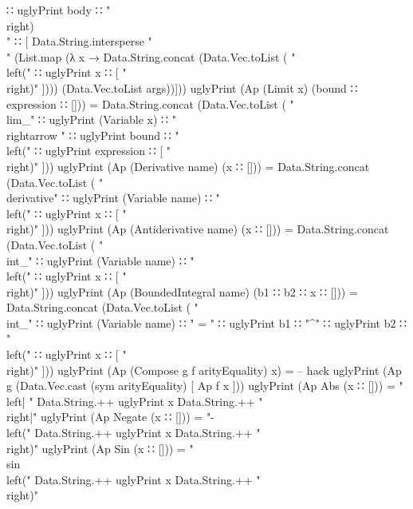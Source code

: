 \documentclass{report}
\begin{document}
\begin{code}
      ∷ uglyPrint body
      ∷ "\\right)\\ "
      ∷ [ Data.String.intersperse
            "\\ "
            (List.map
              (λ x → Data.String.concat (Data.Vec.toList
                       ( "\\left("
                       ∷ uglyPrint x
                       ∷ [ "\\right)" ])))
              (Data.Vec.toList args))]))
  uglyPrint (Ap (Limit x) (bound ∷ expression ∷ [])) =
    Data.String.concat (Data.Vec.toList
      ( "\\lim_{"
      ∷ uglyPrint (Variable x)
      ∷ " \\rightarrow "
      ∷ uglyPrint bound
      ∷ "} \\left("
      ∷ uglyPrint expression
      ∷ [ "\\right)" ]))
  uglyPrint (Ap (Derivative name) (x ∷ [])) =
    Data.String.concat (Data.Vec.toList
      ( "\\derivative{"
      ∷ uglyPrint (Variable name)
      ∷ "} \\left("
      ∷ uglyPrint x
      ∷ [ "\\right)" ]))
  uglyPrint (Ap (Antiderivative name) (x ∷ [])) =
    Data.String.concat (Data.Vec.toList
      ( "\\int_{"
      ∷ uglyPrint (Variable name)
      ∷ "} \\left("
      ∷ uglyPrint x
      ∷ [ "\\right)" ]))
  uglyPrint (Ap (BoundedIntegral name) (b1 ∷ b2 ∷ x ∷ [])) =
    Data.String.concat (Data.Vec.toList
      ( "\\int_{"
      ∷ uglyPrint (Variable name)
      ∷ " = "
      ∷ uglyPrint b1
      ∷ "}^{"
      ∷ uglyPrint b2
      ∷ "} \\left("
      ∷ uglyPrint x
      ∷ [ "\\right)" ]))
  uglyPrint (Ap (Compose g f arityEquality) x) =
    -- hack
    uglyPrint (Ap g (Data.Vec.cast (sym arityEquality) [ Ap f x ]))
  uglyPrint (Ap Abs (x ∷ [])) =
    "\\left| " Data.String.++ uglyPrint x Data.String.++ "\\right|"
  uglyPrint (Ap Negate (x ∷ [])) =
    "- \\left(" Data.String.++ uglyPrint x Data.String.++ "\\right)"
  uglyPrint (Ap Sin (x ∷ [])) =
    "\\sin \\left(" Data.String.++ uglyPrint x Data.String.++ "\\right)"

\end{code}
\end{document}
